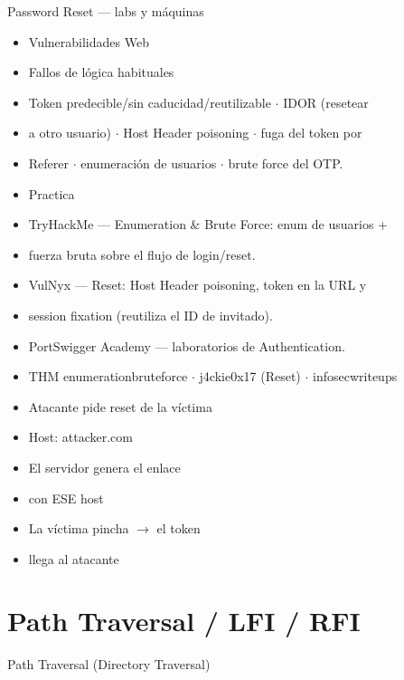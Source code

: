 \documentclass[aspectratio=169,10pt]{beamer}
\begin{document}
\begin{frame}[allowframebreaks]{Password Reset --- labs y máquinas}
\small
  \begin{itemize}
  \item Vulnerabilidades Web
  \item Fallos de lógica habituales
  \item Token predecible/sin caducidad/reutilizable $\cdot$ IDOR (resetear
  \item a otro usuario) $\cdot$ Host Header poisoning $\cdot$ fuga del token por
  \item Referer $\cdot$ enumeración de usuarios $\cdot$ brute force del OTP.
  \item Practica
  \item TryHackMe --- Enumeration \& Brute Force: enum de usuarios +
  \item fuerza bruta sobre el flujo de login/reset.
  \item VulNyx --- Reset: Host Header poisoning, token en la URL y
  \item session fixation (reutiliza el ID de invitado).
  \item PortSwigger Academy --- laboratorios de Authentication.
  \item THM enumerationbruteforce $\cdot$ j4ckie0x17 (Reset) $\cdot$ infosecwriteups
  \item Atacante pide reset de la víctima
  \item Host: attacker.com
  \item El servidor genera el enlace
  \item con ESE host
  \item La víctima pincha $\rightarrow$ el token
  \item llega al atacante
  \end{itemize}
\end{frame}

\section{Path Traversal / LFI / RFI}

\begin{frame}[allowframebreaks]{Path Traversal (Directory Traversal)}
\end{frame}
\end{document}

